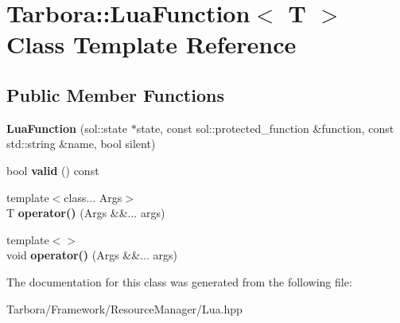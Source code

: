 \hypertarget{classTarbora_1_1LuaFunction}{}\section{Tarbora\+:\+:Lua\+Function$<$ T $>$ Class Template Reference}
\label{classTarbora_1_1LuaFunction}
\subsection*{Public Member Functions}
\begin{DoxyCompactItemize}
\item 
\mbox{\label{classTarbora_1_1LuaFunction_a2d570c5008fff45a2c6b3219690959a3}} 
{\bfseries Lua\+Function} (sol\+::state $\ast$state, const sol\+::protected\+\_\+function \&function, const std\+::string \&name, bool silent)
\item 
\mbox{\label{classTarbora_1_1LuaFunction_a7915f7c679987d5f5645cb259ff6cc60}} 
bool {\bfseries valid} () const
\item 
\mbox{\label{classTarbora_1_1LuaFunction_af2d444cf8d3d32bec3ed038c90901c9a}} 
{\footnotesize template$<$class... Args$>$ }\\T {\bfseries operator()} (Args \&\&... args)
\item 
\mbox{\label{classTarbora_1_1LuaFunction_ab32291caf4a74910113389ff6c6e5aab}} 
{\footnotesize template$<$$>$ }\\void {\bfseries operator()} (Args \&\&... args)
\end{DoxyCompactItemize}


The documentation for this class was generated from the following file\+:\begin{DoxyCompactItemize}
\item 
Tarbora/\+Framework/\+Resource\+Manager/Lua.\+hpp\end{DoxyCompactItemize}
